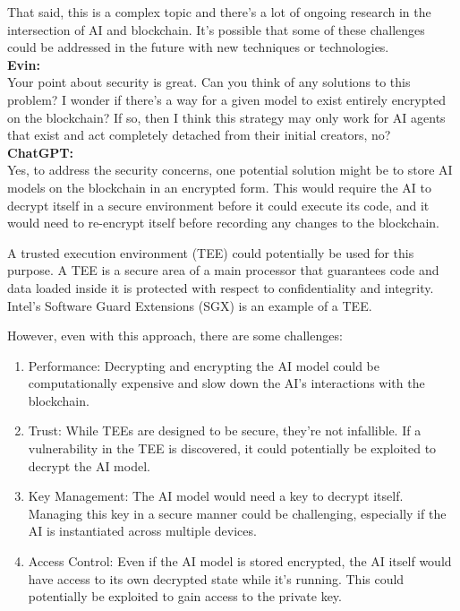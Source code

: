 \documentclass{article}[10pt]
\begin{document}
That said, this is a complex topic and there's a lot of ongoing research in the intersection of AI and blockchain. 
It's possible that some of these challenges could be addressed in the future with new techniques or technologies.\\

\noindent \textbf{Evin:}\\
Your point about security is great. 
Can you think of any solutions to this problem? 
I wonder if there's a way for a given model to exist entirely encrypted on the blockchain? 
If so, then I think this strategy may only work for AI agents that exist and act completely detached from their initial creators, no?\\

\noindent \textbf{ChatGPT:}\\
Yes, to address the security concerns, one potential solution might be to store AI models on the blockchain in an encrypted form. 
This would require the AI to decrypt itself in a secure environment before it could execute its code, and it would need to re-encrypt itself before recording any changes to the blockchain.\par 

A trusted execution environment (TEE) could potentially be used for this purpose. 
A TEE is a secure area of a main processor that guarantees code and data loaded inside it is protected with respect to confidentiality and integrity. 
Intel's Software Guard Extensions (SGX) is an example of a TEE.\par

However, even with this approach, there are some challenges:
\begin{enumerate}
    \item Performance: 
    Decrypting and encrypting the AI model could be computationally expensive and slow down the AI's interactions with the blockchain.
    \item Trust: 
    While TEEs are designed to be secure, they're not infallible. 
    If a vulnerability in the TEE is discovered, it could potentially be exploited to decrypt the AI model.
    \item Key Management: 
    The AI model would need a key to decrypt itself. 
    Managing this key in a secure manner could be challenging, especially if the AI is instantiated across multiple devices.
    \item Access Control: 
    Even if the AI model is stored encrypted, the AI itself would have access to its own decrypted state while it's running. 
    This could potentially be exploited to gain access to the private key.
\end{enumerate}
\end{document}
